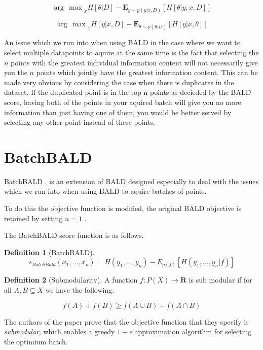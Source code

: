 \documentclass[12pt, a4paper]{report}
\theoremstyle{definition}
\newtheorem{definition}{Definition}[section]
\begin{document}
$${\arg\,\max}_x H \left[ \theta | D \right] - \mathbf{E}_{y \sim p(y | x, D)} \left[ H\left[ \theta | y, x, D\right]\right]$$

$${\arg\,\max}_x H \left[ y | x, D \right] - \mathbf{E}_{\theta \sim p(\theta | D)} \left[ H\left[ y | x, \theta \right]\right]$$


An issue which we run into when using BALD in the case where we want to select multiple datapoints to aquire at the same time is the fact that selecting the $n$ points with the greatest individual information content will not necessarily give you the $n$ points which jointly have the greatest information content. This can be made very obvious by considering the case when there is duplicates in the dataset. If the duplicated point is in the top n points as decieded by the BALD score, having both of the points in your aquired batch will give you no more information than just having one of them, you would be better served by selecting any other point instead of these points.

\section{BatchBALD}
BatchBALD \cite{kirsch2019batchbald}, is an extension of BALD designed especially to deal with the issues which we run into when using BALD to aquire batches of points.

To do this the objective function is modified, the original BALD objective is retained by setting $n = 1$ .

The BatchBALD score function is as follows.


\begin{definition}[BatchBALD]
    $$s_{BatchBald} (x_1, \ldots, x_n) = H(y_1, \ldots, y_n) - E_{p(f)}\left[H(y_1, \ldots, y_n | f)\right]$$
\end{definition}


\begin{definition}[Submodularity]
    A function $f : P(X) \rightarrow \mathbf{R}$ is sub modular if for all $A,B \subseteq X$ we have the following.

    $$f(A) + f(B) \geq f\left( A \cup B \right) +  f\left(A \cap B \right) $$
\end{definition}

The authors of the paper prove that the objective function that they specify is \textit{submodular}, which enables a greedy $1 - \epsilon$ approximation algorithm for selecting the optimium batch.
\end{document}
